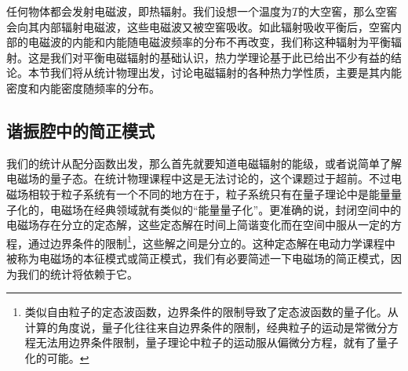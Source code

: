 \documentclass[../../main.tex]{subfiles}
\begin{document}
任何物体都会发射电磁波，即热辐射。我们设想一个温度为\(T\)的大空窖，那么空窖会向其内部辐射电磁波，这些电磁波又被空窖吸收。如此辐射吸收平衡后，空窖内部的电磁波的内能和内能随电磁波频率的分布不再改变，我们称这种辐射为平衡辐射。这是我们对平衡电磁辐射的基础认识，热力学理论基于此已给出不少有益的结论。本节我们将从统计物理出发，讨论电磁辐射的各种热力学性质，主要是其内能密度和内能密度随频率的分布。

\subsection{谐振腔中的简正模式}
我们的统计从配分函数出发，那么首先就要知道电磁辐射的能级，或者说简单了解电磁场的量子态。在统计物理课程中这是无法讨论的，这个课题过于超前。不过电磁场相较于粒子系统有一个不同的地方在于，粒子系统只有在量子理论中是能量量子化的，电磁场在经典领域就有类似的“能量量子化”。更准确的说，封闭空间中的电磁场存在分立的定态解，这些定态解在时间上简谐变化而在空间中服从一定的方程，通过边界条件的限制\footnote{类似自由粒子的定态波函数，边界条件的限制导致了定态波函数的量子化。从计算的角度说，量子化往往来自边界条件的限制，经典粒子的运动是常微分方程无法用边界条件限制，量子理论中粒子的运动服从偏微分方程，就有了量子化的可能。}，这些解之间是分立的。这种定态解在电动力学课程中被称为电磁场的本征模式或简正模式，我们有必要简述一下电磁场的简正模式，因为我们的统计将依赖于它。
\end{document}
